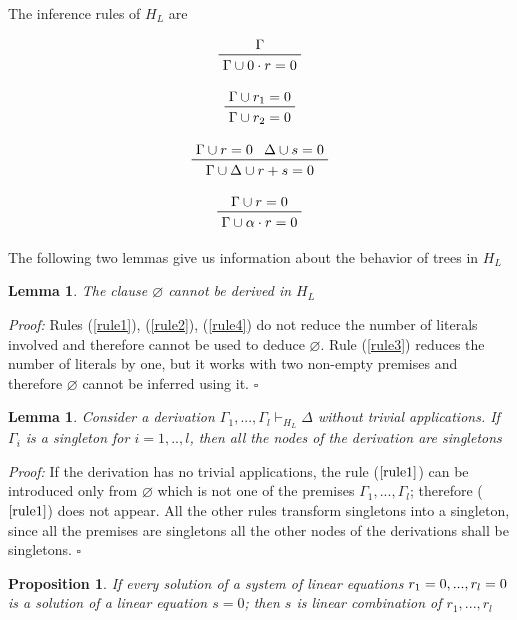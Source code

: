 \documentclass[a4paper,12pt,oneside]{book}
\newtheorem{proposition}[theorem]{Proposition}
\newtheorem{lemma}[theorem]{Lemma}
\newcommand*{\QED}{\hfill\ensuremath{\square}}
\let\emptyset\varnothing
\begin{document}
\noindent The inference rules of $H_L$ are

\begin{equation} \label{rule1}
\prftree{\Gamma}{\Gamma\cup 0\cdot r=0 }
\end{equation}

\begin{equation} \label{rule2}
\prftree{\Gamma\cup r_1=0 }{\Gamma\cup r_2=0 }
\end{equation}

\begin{equation} \label{rule3}
\prftree{\Gamma\cup r=0} {\Delta\cup s=0 }{\Gamma\cup\Delta\cup  r+s=0}
\end{equation}

\begin{equation} \label{rule4}
\prftree{\Gamma\cup r=0}{\Gamma\cup \alpha\cdot r=0 }
\end{equation}

\noindent The following two lemmas give us information about the behavior of trees in $H_L$
\begin{lemma}\label{lemma_nempty}
The clause $\emptyset$ cannot be derived in $H_L$
\end{lemma}
\textit{Proof:} Rules (\ref{rule1}), (\ref{rule2}), (\ref{rule4}) do not reduce the number of literals involved and therefore cannot be used to deduce $\emptyset$. Rule (\ref{rule3}) reduces the number of literals by one, but it works with two non-empty premises and therefore $\emptyset$ cannot be inferred using it. \QED

\begin{lemma}\label{lemma_onlysingletons}
Consider a derivation $\Gamma_1,...,\Gamma_l \vdash_{H_L} \Delta $ without trivial applications. 
If $\Gamma_i$ is a singleton for $i=1,..,l$, then all the nodes of the derivation are singletons
\end{lemma}
\textit{Proof:} If the derivation has no trivial applications, the rule ($\ref{rule1}$) can be introduced only from $\emptyset$ which is not one of the premises $\Gamma_1,...,\Gamma_l$; therefore ($\ref{rule1}$)  does not appear. All the other rules transform singletons into a singleton, since all the premises are singletons all the other nodes of the derivations shall be singletons. \QED

\begin{proposition} 
If every solution of a system of linear equations $r_1=0,...,r_l=\nobreak 0$  is a solution of a linear equation $s=0$; then $s$ is linear combination of $r_1,...,r_l$
\end{proposition}
\end{document}
